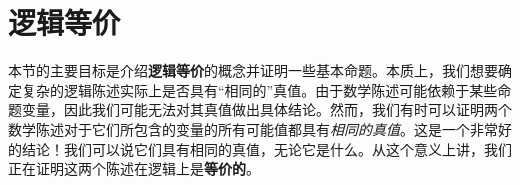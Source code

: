 \section{逻辑等价}

本节的主要目标是介绍\textbf{逻辑等价}的概念并证明一些基本命题。本质上，我们想要确定复杂的逻辑陈述实际上是否具有``相同的''真值。由于数学陈述可能依赖于某些命题变量，因此我们可能无法对其真值做出具体结论。然而，我们有时可以证明两个数学陈述对于它们所包含的变量的所有可能值都具有\emph{相同的真值}。这是一个非常好的结论！我们可以说它们具有相同的真值，无论它是什么。从这个意义上讲，我们正在证明这两个陈述在逻辑上是\textbf{等价的}。















